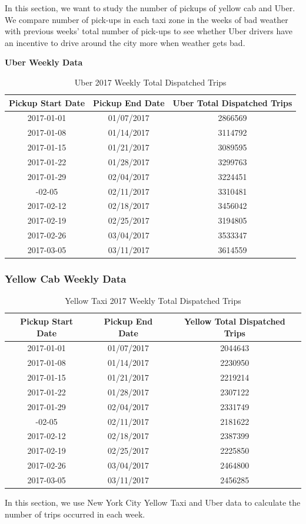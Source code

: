 \documentclass[12pt,twoside]{reedthesis}
\theoremstyle{definition}
\theoremstyle{definition}
\theoremstyle{definition}
\theoremstyle{remark}
\begin{document}
In this section, we want to study the number of pickups of yellow cab
and Uber. We compare number of pick-ups in each taxi zone in the weeks
of bad weather with previous weeks' total number of pick-ups to see
whether Uber drivers have an incentive to drive around the city more
when weather gets bad.

\textbf{Uber Weekly Data}
\begin{table}

\caption{\label{tab:unnamed-chunk-64}Uber 2017 Weekly Total Dispatched Trips}
\centering
\begin{tabular}[t]{ccc}
\toprule
Pickup Start Date & Pickup End Date & Uber Total Dispatched Trips\\
\midrule
2017-01-01 & 01/07/2017 & 2866569\\
2017-01-08 & 01/14/2017 & 3114792\\
2017-01-15 & 01/21/2017 & 3089595\\
2017-01-22 & 01/28/2017 & 3299763\\
2017-01-29 & 02/04/2017 & 3224451\\
\addlinespace
2017-02-05 & 02/11/2017 & 3310481\\
2017-02-12 & 02/18/2017 & 3456042\\
2017-02-19 & 02/25/2017 & 3194805\\
2017-02-26 & 03/04/2017 & 3533347\\
2017-03-05 & 03/11/2017 & 3614559\\
\bottomrule
\end{tabular}
\end{table}
\subsubsection{Yellow Cab Weekly Data}\label{yellow-cab-weekly-data}
\begin{table}

\caption{\label{tab:unnamed-chunk-67}Yellow Taxi 2017 Weekly Total Dispatched Trips}
\centering
\begin{tabular}[t]{ccc}
\toprule
Pickup Start Date & Pickup End Date & Yellow Total Dispatched Trips\\
\midrule
2017-01-01 & 01/07/2017 & 2044643\\
2017-01-08 & 01/14/2017 & 2230950\\
2017-01-15 & 01/21/2017 & 2219214\\
2017-01-22 & 01/28/2017 & 2307122\\
2017-01-29 & 02/04/2017 & 2331749\\
\addlinespace
2017-02-05 & 02/11/2017 & 2181622\\
2017-02-12 & 02/18/2017 & 2387399\\
2017-02-19 & 02/25/2017 & 2225850\\
2017-02-26 & 03/04/2017 & 2464800\\
2017-03-05 & 03/11/2017 & 2456285\\
\bottomrule
\end{tabular}
\end{table}
In this section, we use New York City Yellow Taxi and Uber data to
calculate the number of trips occurred in each week.
\end{document}
